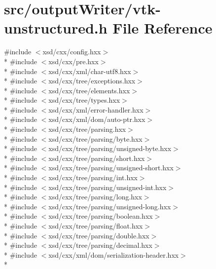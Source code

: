 \hypertarget{vtk-unstructured_8h}{}\section{src/output\+Writer/vtk-\/unstructured.h File Reference}
\label{vtk-unstructured_8h}
{\ttfamily \#include $<$xsd/cxx/config.\+hxx$>$}\\*
{\ttfamily \#include $<$xsd/cxx/pre.\+hxx$>$}\\*
{\ttfamily \#include $<$xsd/cxx/xml/char-\/utf8.\+hxx$>$}\\*
{\ttfamily \#include $<$xsd/cxx/tree/exceptions.\+hxx$>$}\\*
{\ttfamily \#include $<$xsd/cxx/tree/elements.\+hxx$>$}\\*
{\ttfamily \#include $<$xsd/cxx/tree/types.\+hxx$>$}\\*
{\ttfamily \#include $<$xsd/cxx/xml/error-\/handler.\+hxx$>$}\\*
{\ttfamily \#include $<$xsd/cxx/xml/dom/auto-\/ptr.\+hxx$>$}\\*
{\ttfamily \#include $<$xsd/cxx/tree/parsing.\+hxx$>$}\\*
{\ttfamily \#include $<$xsd/cxx/tree/parsing/byte.\+hxx$>$}\\*
{\ttfamily \#include $<$xsd/cxx/tree/parsing/unsigned-\/byte.\+hxx$>$}\\*
{\ttfamily \#include $<$xsd/cxx/tree/parsing/short.\+hxx$>$}\\*
{\ttfamily \#include $<$xsd/cxx/tree/parsing/unsigned-\/short.\+hxx$>$}\\*
{\ttfamily \#include $<$xsd/cxx/tree/parsing/int.\+hxx$>$}\\*
{\ttfamily \#include $<$xsd/cxx/tree/parsing/unsigned-\/int.\+hxx$>$}\\*
{\ttfamily \#include $<$xsd/cxx/tree/parsing/long.\+hxx$>$}\\*
{\ttfamily \#include $<$xsd/cxx/tree/parsing/unsigned-\/long.\+hxx$>$}\\*
{\ttfamily \#include $<$xsd/cxx/tree/parsing/boolean.\+hxx$>$}\\*
{\ttfamily \#include $<$xsd/cxx/tree/parsing/float.\+hxx$>$}\\*
{\ttfamily \#include $<$xsd/cxx/tree/parsing/double.\+hxx$>$}\\*
{\ttfamily \#include $<$xsd/cxx/tree/parsing/decimal.\+hxx$>$}\\*
{\ttfamily \#include $<$xsd/cxx/xml/dom/serialization-\/header.\+hxx$>$}\\*

